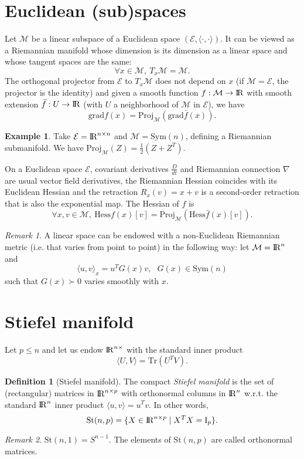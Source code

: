 \documentclass[10pt,a4paper]{book}
\theoremstyle{definition}
\newtheorem{defn}{Definition}[section]
\newtheorem{exm}{Example}[section]
\theoremstyle{plain}
\theoremstyle{remark}
\newtheorem{rmk}{Remark}[section]
\newcommand{\grad}{\textrm{grad}}
\newcommand{\E}{\mathcal{E}}
\newcommand \M {\mathcal{M}}
\newcommand \Stif {\textrm{St}}
\def\R{{\rm I\kern-0.16em R}}
\begin{document}
\section{Euclidean (sub)spaces}
Let $\M$ be a linear subspace of a Euclidean space $(\E,\langle \cdot,\cdot\rangle)$. It can be viewed as a Riemannian manifold whose dimension is its dimension as a linear space and whose tangent spaces are the same:
$$\forall x\in \M,~T_x\M=\M.$$
The orthogonal projector from $\E$ to $T_x\M$ does not depend on $x$ (if $\M=\E$, the projector is the identity) and given a smooth function $f:\M \to \R$ with smooth extension $\bar{f}: U\to \R$ (with $U$ a neighborhood of $\M$ in $\E$), we have
$$\grad f(x)=\text{Proj}_{\M}(\grad \bar{f}(x)).$$
\begin{exm}
Take $\E=\R^{n\times n}$ and $\M=\text{Sym}(n)$, defining a Riemannian submanifold. We have $\text{Proj}_{\M}(Z)=\frac{1}{2}(Z+Z^{T})$.
\end{exm}
On a Euclidean space $\E$, covariant derivatives $\frac{D}{dt}$ and Riemannian connection $\nabla$ are usual vector field derivatives, the Riemannian Hessian coincides with its Euclidean Hessian and the retraction $R_x(v)=x+v$ is a second-order retraction that is also the exponential map. The Hessian of $f$ is
$$\forall x,v \in \M, ~\text{Hess}f(x)[v]=\text{Proj}_{\M}(\text{Hess}\bar{f}(x)[v]).$$
\begin{rmk}
A linear space can be endowed with a non-Euclidean Riemannian metric (i.e. that varies from point to point) in the following way: let $\M=\R^n$ and
$$\langle u,v\rangle_x=u^{T}G(x)v,~~~G(x)\in \text{Sym}(n)$$
such that $G(x)\succ 0$ varies smoothly with $x$.
\end{rmk}
\section{Stiefel manifold}
Let $p\leq n$ and let us endow $\R^{n\times}$ with the standard inner product
$$\langle U,V \rangle = \text{Tr}(U^{T}V).$$
\begin{defn}[Stiefel manifold]
The compact \emph{Stiefel manifold} is the set of (rectangular) matrices in $\R^{n\times p}$ with orthonormal columns in $\R^n$ w.r.t. the standard $\R^n$ inner product $\langle u,v\rangle =u^{T}v$. In other words,
$$\Stif(n,p)=\{X\in \R^{n\times p} \mid X^{T}X=\text{I}_p\}.$$
\end{defn}
\begin{rmk}
$\Stif(n,1) =S^{n-1}$. The elements of $\Stif(n,p)$ are called orthonormal matrices.
\end{rmk}
\end{document}
